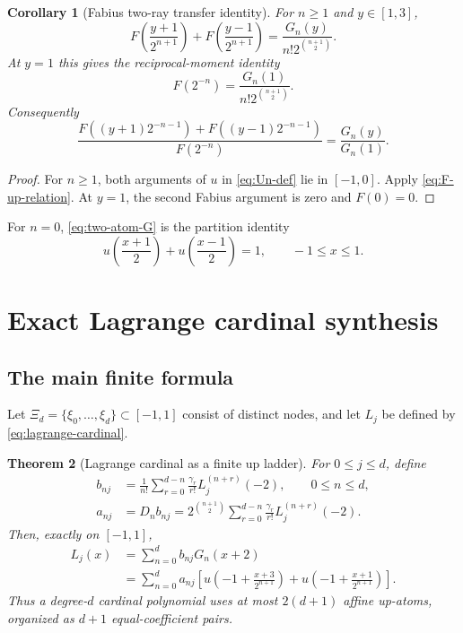 \documentclass[11pt,oneside]{article}
\newtheorem{theorem}{Theorem}[section]
\newtheorem{corollary}[theorem]{Corollary}
\theoremstyle{definition}
\theoremstyle{remark}
\begin{document}
\begin{corollary}[Fabius two-ray transfer identity]
\label{cor:F-two-ray}
For $n\ge1$ and $y\in[1,3]$,
\begin{equation}
 F\!\left(\frac{y+1}{2^{n+1}}\right)
 +F\!\left(\frac{y-1}{2^{n+1}}\right)
 =\frac{G_n(y)}{n!2^{\binom{n+1}{2}}}.
 \label{eq:F-two-ray}
\end{equation}
At $y=1$ this gives the reciprocal-moment identity
\begin{equation}
 \boxed{
 F(2^{-n})=\frac{G_n(1)}{n!2^{\binom{n+1}{2}}}.}
 \label{eq:F-reciprocal-moment}
\end{equation}
Consequently
\begin{equation}
 \frac{
 F((y+1)2^{-n-1})+F((y-1)2^{-n-1})
 }{F(2^{-n})}
 =\frac{G_n(y)}{G_n(1)}.
 \label{eq:F-transfer-ratio}
\end{equation}
\end{corollary}

\begin{proof}
For $n\ge1$, both arguments of $u$ in \eqref{eq:Un-def} lie in $[-1,0]$.
Apply \eqref{eq:F-up-relation}.  At $y=1$, the second Fabius argument is
zero and $F(0)=0$.
\end{proof}

For $n=0$, \eqref{eq:two-atom-G} is the partition identity
\begin{equation}
 u\!\left(\frac{x+1}{2}\right)+u\!\left(\frac{x-1}{2}\right)=1,
 \qquad -1\le x\le1.
 \label{eq:partition-pair}
\end{equation}

\section{Exact Lagrange cardinal synthesis}

\subsection{The main finite formula}
Let $\Xi_d=\{\xi_0,\ldots,\xi_d\}\subset[-1,1]$ consist of distinct nodes,
and let $L_j$ be defined by \eqref{eq:lagrange-cardinal}.

\begin{theorem}[Lagrange cardinal as a finite up ladder]
\label{thm:lagrange-up}
For $0\le j\le d$, define
\begin{align}
 b_{nj}
 &=\frac1{n!}\sum_{r=0}^{d-n}
   \frac{\gamma_r}{r!}L_j^{(n+r)}(-2),
 \qquad 0\le n\le d,
 \label{eq:bnj}\\
 a_{nj}
 &=D_nb_{nj}
 =2^{\binom{n+1}{2}}
   \sum_{r=0}^{d-n}\frac{\gamma_r}{r!}L_j^{(n+r)}(-2).
 \label{eq:anj}
\end{align}
Then, exactly on $[-1,1]$,
\begin{align}
 L_j(x)
 &=\sum_{n=0}^{d}b_{nj}G_n(x+2)
 \label{eq:Lj-G}\\
 &=\boxed{\sum_{n=0}^{d}a_{nj}
 \left[
 u\!\left(-1+\frac{x+3}{2^{n+1}}\right)
 +u\!\left(-1+\frac{x+1}{2^{n+1}}\right)
 \right].}
 \label{eq:Lj-up}
\end{align}
Thus a degree-$d$ cardinal polynomial uses at most $2(d+1)$ affine
up-atoms, organized as $d+1$ equal-coefficient pairs.
\end{theorem}
\end{document}
